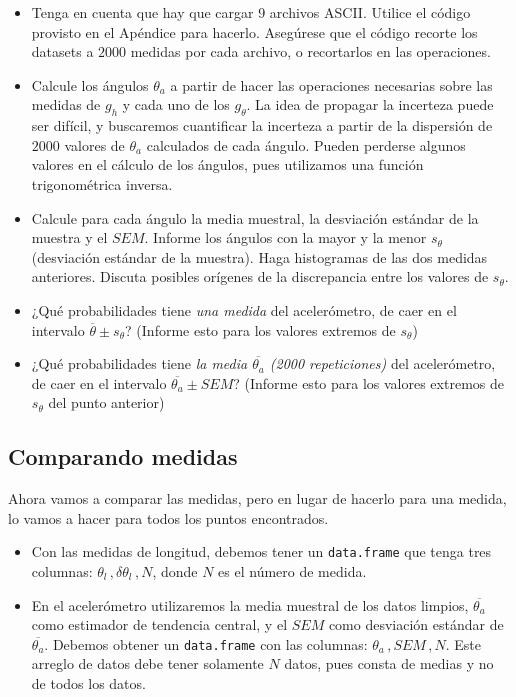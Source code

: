 \documentclass[10pt,a4paper]{article}
\theoremstyle{definition}
\begin{document}
\begin{itemize}
\item[a)]  Tenga en cuenta que hay que cargar 9 archivos ASCII. Utilice el código provisto en el Apéndice para hacerlo. Asegúrese que el código recorte los datasets a $2000$ medidas por cada archivo, o recortarlos en las operaciones. 

\item[b)] Calcule los ángulos $\theta_{a}$ a partir de hacer las operaciones necesarias sobre las medidas de $g_h$ y cada uno de los $g_\theta$. La idea de propagar la incerteza puede ser difícil, y buscaremos cuantificar la incerteza a partir de la dispersión de $2000$ valores de $\theta_a$ calculados de cada ángulo. Pueden perderse algunos valores en el cálculo de los ángulos, pues utilizamos una función trigonométrica inversa.

\item[c)] Calcule para cada ángulo la media muestral, la desviación estándar de la muestra y el $SEM$. Informe los ángulos con la mayor y la menor $s_\theta$ (desviación estándar de la muestra). Haga histogramas de las dos medidas anteriores. Discuta posibles orígenes de la discrepancia entre los valores de $s_\theta$.

\item[d)] ¿Qué probabilidades tiene \textit{una medida} del acelerómetro, de caer en el intervalo $\overline{\theta} \pm s_\theta$? (Informe esto para los valores extremos de $s_\theta$)

\item[e)] ¿Qué probabilidades tiene \textit{la media $\overline{\theta_{a}}$ (2000 repeticiones)} del acelerómetro, de caer en el intervalo $\overline{\theta_a} \pm SEM$? (Informe esto para los valores extremos de $s_{\theta}$ del punto anterior)

\end{itemize}




\subsection{Comparando medidas}

Ahora vamos a comparar las medidas, pero en lugar de hacerlo para una medida, lo vamos a hacer para todos los puntos encontrados.

\begin{itemize}
\item[$\bullet$] Con las medidas de longitud, debemos tener un \texttt{data.frame} que tenga tres columnas: $\theta_l \, , \delta \theta_l \, , N$, donde $N$ es el número de medida.
\item[$\bullet$] En el acelerómetro utilizaremos la media muestral de los datos limpios, $\overline{\theta_{a}}$ como estimador de tendencia central, y el $SEM$ como desviación estándar de $\overline{\theta_{a}}$. Debemos obtener un \texttt{data.frame} con las columnas: $\theta_{a} \, , SEM\, , N$. Este arreglo de datos debe tener solamente $N$ datos, pues consta de medias y no de todos los datos. 
\end{itemize}
\end{document}

